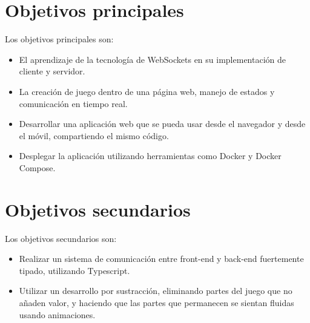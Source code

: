 \section{Objetivos principales}

Los objetivos principales son:

\begin{itemize}
	\item El aprendizaje de la tecnología de WebSockets en su implementación de cliente y servidor.
	\item La creación de juego  dentro de una página web, manejo de estados  y comunicación en tiempo real.
	\item Desarrollar una aplicación web que se pueda usar desde el navegador y desde el móvil, compartiendo el mismo código.
	\item Desplegar la aplicación utilizando herramientas como Docker y Docker Compose.
\end{itemize}


\section{Objetivos secundarios}

Los objetivos secundarios son:

\begin{itemize}
	\item Realizar un sistema de comunicación entre front-end y back-end fuertemente tipado, utilizando Typescript.
	\item Utilizar un desarrollo por sustracción, eliminando partes del juego que no añaden valor, y haciendo que las partes que permanecen se sientan fluidas usando animaciones.
\end{itemize}
